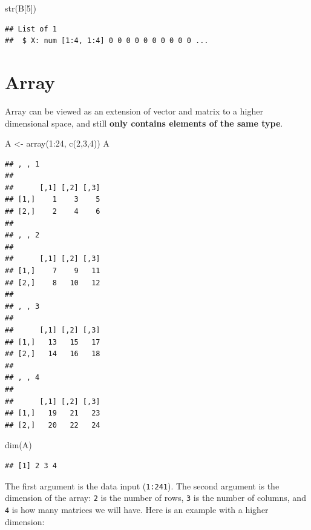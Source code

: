 \documentclass[
]{book}
\newenvironment{Shaded}{\begin{snugshade}}{\end{snugshade}}
\newcommand{\DecValTok}[1]{\textcolor[rgb]{0.00,0.00,0.81}{#1}}
\newcommand{\FunctionTok}[1]{\textcolor[rgb]{0.00,0.00,0.00}{#1}}
\newcommand{\NormalTok}[1]{#1}
\newcommand{\OtherTok}[1]{\textcolor[rgb]{0.56,0.35,0.01}{#1}}
\newcommand{\SpecialCharTok}[1]{\textcolor[rgb]{0.00,0.00,0.00}{#1}}
\begin{document}
\begin{Shaded}
\begin{Highlighting}[]
\FunctionTok{str}\NormalTok{(B[}\DecValTok{5}\NormalTok{])}
\end{Highlighting}
\end{Shaded}

\begin{verbatim}
## List of 1
##  $ X: num [1:4, 1:4] 0 0 0 0 0 0 0 0 0 0 ...
\end{verbatim}

\hypertarget{array}{%
\section{Array}\label{array}}

Array can be viewed as an extension of vector and matrix to a higher dimensional space, and still \textbf{only contains elements of the same type}.

\begin{Shaded}
\begin{Highlighting}[]
\NormalTok{A }\OtherTok{\textless{}{-}} \FunctionTok{array}\NormalTok{(}\DecValTok{1}\SpecialCharTok{:}\DecValTok{24}\NormalTok{, }\FunctionTok{c}\NormalTok{(}\DecValTok{2}\NormalTok{,}\DecValTok{3}\NormalTok{,}\DecValTok{4}\NormalTok{))}
\NormalTok{A}
\end{Highlighting}
\end{Shaded}

\begin{verbatim}
## , , 1
## 
##      [,1] [,2] [,3]
## [1,]    1    3    5
## [2,]    2    4    6
## 
## , , 2
## 
##      [,1] [,2] [,3]
## [1,]    7    9   11
## [2,]    8   10   12
## 
## , , 3
## 
##      [,1] [,2] [,3]
## [1,]   13   15   17
## [2,]   14   16   18
## 
## , , 4
## 
##      [,1] [,2] [,3]
## [1,]   19   21   23
## [2,]   20   22   24
\end{verbatim}

\begin{Shaded}
\begin{Highlighting}[]
\FunctionTok{dim}\NormalTok{(A)}
\end{Highlighting}
\end{Shaded}

\begin{verbatim}
## [1] 2 3 4
\end{verbatim}

The first argument is the data input (\texttt{1:241}). The second argument is the dimension of the array: \texttt{2} is the number of rows, \texttt{3} is the number of columns, and \texttt{4} is how many matrices we will have. Here is an example with a higher dimension:
\end{document}
